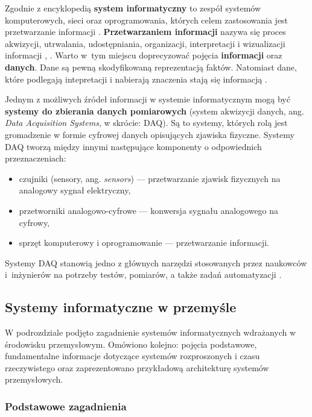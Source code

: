 \documentclass[a4paper, 12pt, twoside]{article}
\begin{document}
Zgodnie z encyklopedią \textbf{system informatyczny} to zespół systemów komputerowych,
sieci oraz oprogramowania, których celem zastosowania jest
przetwarzanie informacji \cite{system-informatyczny}.
\textbf{Przetwarzaniem informacji} nazywa się proces akwizycji, utrwalania, udostępniania,
organizacji, interpretacji i wizualizacji informacji \cite{information-science},
\cite{information-processing}. Warto w~tym miejscu doprecyzować pojęcia
\textbf{informacji} oraz \textbf{danych}. Dane są pewną skodyfikowaną reprezentacją
faktów. Natomiast dane, które podlegają intepretacji i nabierają znaczenia
stają się informacją \cite{dane-informacja-wiedza}.

Jednym z możliwych źródeł informacji w systemie informatycznym mogą być
\textbf{systemy do zbierania danych pomiarowych} (system akwizycji danych, ang. \emph{Data Acquisition Systems}, w skrócie: DAQ).
Są to systemy, których rolą jest gromadzenie w formie cyfrowej danych opisujących
zjawiska fizyczne. Systemy DAQ tworzą między innymi następujące komponenty
o odpowiednich przeznaczeniach:
\begin{itemize}
      \itemsep0em
      \item czujniki (sensory, ang. \emph{sensors}) --- przetwarzanie zjawisk fizycznych na analogowy sygnał elektryczny,
      \item przetworniki analogowo-cyfrowe --- konwersja sygnału analogowego na cyfrowy,
      \item sprzęt komputerowy i oprogramowanie --- przetwarzanie informacji.
\end{itemize}
Systemy DAQ stanowią jedno z głównych narzędzi stosowanych przez naukowców i~inżynierów
na potrzeby testów, pomiarów, a także zadań automatyzacji \cite{data-aq-systems}.

\subsection{Systemy informatyczne w przemyśle} \label{isp}

W podrozdziale podjęto zagadnienie systemów informatycznych wdrażanych w środowisku przemysłowym.
Omówiono kolejno: pojęcia podstawowe, fundamentalne informacje dotyczące systemów rozproszonych i czasu rzeczywistego
oraz zaprezentowano przykładową architekturę systemów przemysłowych.

\subsubsection{Podstawowe zagadnienia}
\end{document}
